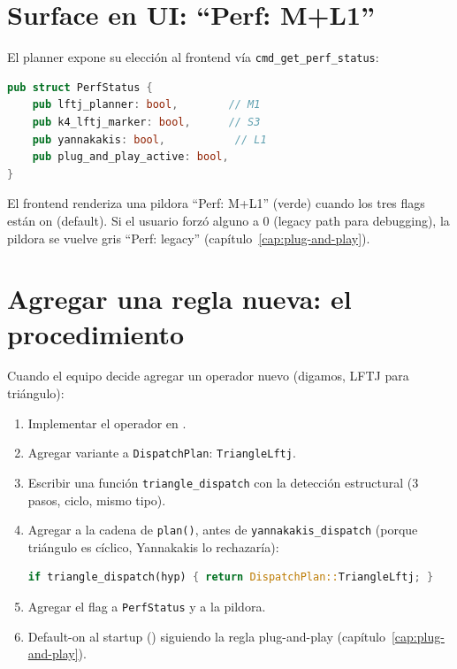 \section{Surface en UI: ``Perf: M+L1''}

El planner expone su elección al frontend vía \texttt{cmd\_get\_perf\_status}:

\begin{lstlisting}[language=Rust]
pub struct PerfStatus {
    pub lftj_planner: bool,        // M1
    pub k4_lftj_marker: bool,      // S3
    pub yannakakis: bool,           // L1
    pub plug_and_play_active: bool,
}
\end{lstlisting}

\noindent
El frontend renderiza una pildora ``Perf: M+L1'' (verde) cuando los
tres flags están on (default). Si el usuario forzó alguno a 0
(legacy path para debugging), la pildora se vuelve gris ``Perf:
legacy'' (capítulo~\ref{cap:plug-and-play}).

\section{Agregar una regla nueva: el procedimiento}

Cuando el equipo decide agregar un operador nuevo (digamos, LFTJ
para triángulo):

\begin{enumerate}
    \item Implementar el operador en
    .
    \item Agregar variante a \texttt{DispatchPlan}:
    \texttt{TriangleLftj}.
    \item Escribir una función \texttt{triangle\_dispatch} con la
    detección estructural (3 pasos, ciclo, mismo tipo).
    \item Agregar a la cadena de \texttt{plan()}, antes de
    \texttt{yannakakis\_dispatch} (porque triángulo es cíclico,
    Yannakakis lo rechazaría):
    \begin{lstlisting}[language=Rust]
        if triangle_dispatch(hyp) { return DispatchPlan::TriangleLftj; }
    \end{lstlisting}
    \item Agregar el flag a \texttt{PerfStatus} y a la pildora.
    \item Default-on al startup ()
    siguiendo la regla plug-and-play (capítulo~\ref{cap:plug-and-play}).
\end{enumerate}

